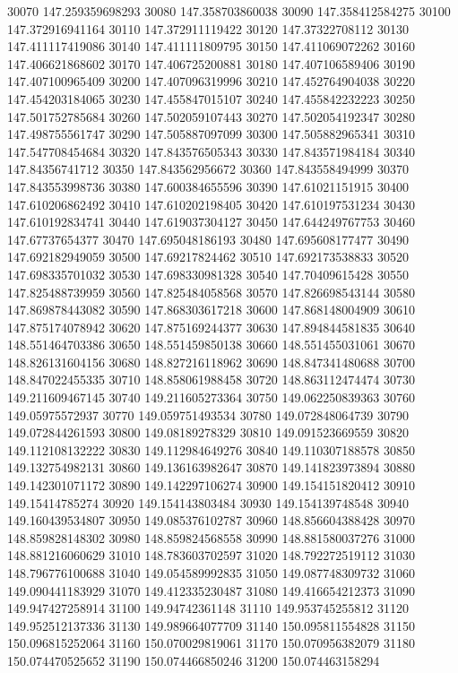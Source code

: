 {30070 147.259359698293
30080 147.358703860038
30090 147.358412584275
30100 147.372916941164
30110 147.372911119422
30120 147.37322708112
30130 147.411117419086
30140 147.411111809795
30150 147.411069072262
30160 147.406621868602
30170 147.406725200881
30180 147.407106589406
30190 147.407100965409
30200 147.407096319996
30210 147.452764904038
30220 147.454203184065
30230 147.455847015107
30240 147.455842232223
30250 147.501752785684
30260 147.502059107443
30270 147.502054192347
30280 147.498755561747
30290 147.505887097099
30300 147.505882965341
30310 147.547708454684
30320 147.843576505343
30330 147.843571984184
30340 147.84356741712
30350 147.843562956672
30360 147.843558494999
30370 147.843553998736
30380 147.600384655596
30390 147.61021151915
30400 147.610206862492
30410 147.610202198405
30420 147.610197531234
30430 147.610192834741
30440 147.619037304127
30450 147.644249767753
30460 147.67737654377
30470 147.695048186193
30480 147.695608177477
30490 147.692182949059
30500 147.69217824462
30510 147.692173538833
30520 147.698335701032
30530 147.698330981328
30540 147.70409615428
30550 147.825488739959
30560 147.825484058568
30570 147.826698543144
30580 147.869878443082
30590 147.868303617218
30600 147.868148004909
30610 147.875174078942
30620 147.875169244377
30630 147.894844581835
30640 148.551464703386
30650 148.551459850138
30660 148.551455031061
30670 148.826131604156
30680 148.827216118962
30690 148.847341480688
30700 148.847022455335
30710 148.858061988458
30720 148.863112474474
30730 149.211609467145
30740 149.211605273364
30750 149.062250839363
30760 149.05975572937
30770 149.059751493534
30780 149.072848064739
30790 149.072844261593
30800 149.08189278329
30810 149.091523669559
30820 149.112108132222
30830 149.112984649276
30840 149.110307188578
30850 149.132754982131
30860 149.136163982647
30870 149.141823973894
30880 149.142301071172
30890 149.142297106274
30900 149.154151820412
30910 149.15414785274
30920 149.154143803484
30930 149.154139748548
30940 149.160439534807
30950 149.085376102787
30960 148.856604388428
30970 148.859828148302
30980 148.859824568558
30990 148.881580037276
31000 148.881216060629
31010 148.783603702597
31020 148.792272519112
31030 148.796776100688
31040 149.054589992835
31050 149.087748309732
31060 149.090441183929
31070 149.412335230487
31080 149.416654212373
31090 149.947427258914
31100 149.94742361148
31110 149.953745255812
31120 149.952512137336
31130 149.989664077709
31140 150.095811554828
31150 150.096815252064
31160 150.070029819061
31170 150.070956382079
31180 150.074470525652
31190 150.074466850246
31200 150.074463158294
}
